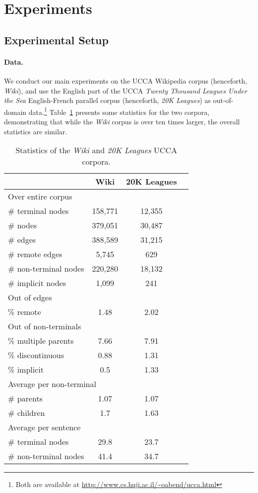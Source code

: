 \documentclass[11pt]{article}
\newcommand{\tabref}[1]{Table~\ref{#1}}
\begin{document}
\section{Experiments}\label{sec:experiments}

\subsection{Experimental Setup}

\paragraph{Data.}\label{sec:data}
We conduct our main experiments on the UCCA Wikipedia corpus (henceforth, \textit{Wiki}),
and use the English part of the UCCA \textit{Twenty Thousand Leagues Under the Sea} English-French parallel corpus (henceforth, \textit{20K Leagues}) as
out-of-domain data.\footnote{Both are available at \url{http://www.cs.huji.ac.il/~oabend/ucca.html}}
\tabref{table:data} presents some statistics for the two corpora, demonstrating that while
the \textit{Wiki} corpus is over ten times larger, the overall statistics are
similar.

\begin{table}
\begin{tabular}{l|ccc}
& Wiki & 20K Leagues \\
\hline
\multicolumn{3}{l}{\footnotesize Over entire corpus} \\
\# terminal nodes & 158,771 & 12,355 \\
\# nodes & 379,051 & 30,487 \\
\# edges & 388,589 & 31,215 \\
\# remote edges & 5,745 & 629 \\
\# non-terminal nodes & 220,280 & 18,132 \\
\# implicit nodes & 1,099 & 241 \\
\multicolumn{3}{l}{\footnotesize Out of edges} \\
\% remote & 1.48 & 2.02 \\
\multicolumn{3}{l}{\footnotesize Out of non-terminals} \\
\% multiple parents & 7.66 & 7.91 \\
\% discontinuous & 0.88 & 1.31 \\
\% implicit & 0.5 & 1.33 \\
\multicolumn{3}{l}{\footnotesize Average per non-terminal} \\
\# parents & 1.07 & 1.07 \\
\# children & 1.7 & 1.63 \\
\multicolumn{3}{l}{\footnotesize Average per sentence} \\
\# terminal nodes & 29.8 & 23.7 \\
\# non-terminal nodes & 41.4 & 34.7 \\
\end{tabular}
\caption{Statistics of the \textit{Wiki} and \textit{20K Leagues} UCCA corpora.}
\label{table:data}
\end{table}
\end{document}
